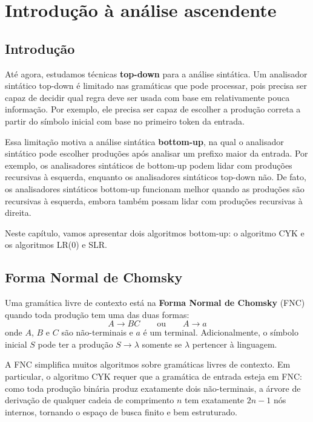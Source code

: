 \chapter{Introdução à análise ascendente}

\section{Introdução}

Até agora, estudamos técnicas \textbf{top-down} para a análise
sintática. Um analisador sintático top-down é limitado nas gramáticas
que pode processar, pois precisa ser capaz de decidir qual regra deve
ser usada com base em relativamente pouca informação. Por exemplo,
ele precisa ser capaz de escolher a produção correta a partir do
símbolo inicial com base no primeiro token da entrada.

Essa limitação motiva a análise sintática \textbf{bottom-up}, na qual
o analisador sintático pode escolher produções após analisar um
prefixo maior da entrada. Por exemplo, os analisadores sintáticos de
bottom-up podem lidar com produções recursivas à esquerda, enquanto
os analisadores sintáticos top-down não. De fato, os analisadores
sintáticos bottom-up funcionam melhor quando as produções são
recursivas à esquerda, embora também possam lidar com produções
recursivas à direita.

Neste capítulo, vamos apresentar dois algoritmos bottom-up: o
algoritmo CYK e os algoritmos LR(0) e SLR.

\section{Forma Normal de Chomsky}

Uma gramática livre de contexto está na \textbf{Forma Normal de Chomsky} (FNC) quando toda produção tem uma das duas formas:
\[
  A \to BC \qquad \text{ou} \qquad A \to a
\]
onde $A$, $B$ e $C$ são não-terminais e $a$ é um terminal. Adicionalmente, o símbolo inicial $S$ pode ter a produção $S \to \lambda$ somente se $\lambda$ pertencer à linguagem.

A FNC simplifica muitos algoritmos sobre gramáticas livres de contexto. Em particular, o algoritmo CYK requer que a gramática de entrada esteja em FNC: como toda produção binária produz exatamente dois não-terminais, a árvore de derivação de qualquer cadeia de comprimento $n$ tem exatamente $2n - 1$ nós internos, tornando o espaço de busca finito e bem estruturado.

